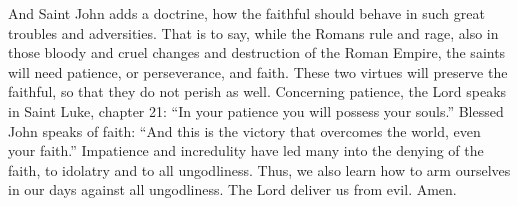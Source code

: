And Saint John adds a doctrine, how the faithful should behave in such great troubles and adversities. That is to say, while the Romans rule and rage, also in those bloody and cruel changes and destruction of the Roman Empire, the saints will need patience, or perseverance, and faith. These two virtues will preserve the faithful, so that they do not perish as well. Concerning patience, the Lord speaks in Saint Luke, chapter 21: “In your patience you will possess your souls.” Blessed John speaks of faith: “And this is the victory that overcomes the world, even your faith.” Impatience and incredulity have led many into the denying of the faith, to idolatry and to all ungodliness. Thus, we also learn how to arm ourselves in our days against all ungodliness. The Lord deliver us from evil. Amen.
